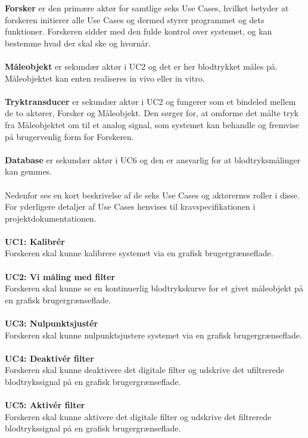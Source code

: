 \textbf{Forsker} er den primære aktør for samtlige seks Use Cases, hvilket betyder at forskeren initierer alle Use Cases og dermed styrer programmet og dets funktioner. Forskeren sidder med den fulde kontrol over systemet, og kan bestemme hvad der skal ske og hvornår.
\\\\
\textbf{Måleobjekt} er sekundær aktør i UC2 og det er her blodtrykket måles på. Måleobjektet kan enten realiseres in vivo eller in vitro.
\\\\
\textbf{Tryktransducer} er sekundær aktør i UC2 og fungerer som et bindeled mellem de to aktører, Forsker og Måleobjekt. Den sørger for, at omforme det målte tryk fra Måleobjektet om til et analog signal, som systemet kan behandle og fremvise på brugervenlig form for Forskeren. 
\\\\
\textbf{Database} er sekundær aktør i UC6 og den er ansvarlig for at blodtryksmålinger kan gemmes.
\\\\
Nedenfor ses en kort beskrivelse af de seks Use Cases og aktørernes roller i disse. For yderligere detaljer af Use Cases henvises til kravspecifikationen i projektdokumentationen.
\\\\
\textbf{UC1: Kalibrér}\\
Forskeren skal kunne kalibrere systemet via en grafisk brugergrænseflade.
\\\\
\textbf{UC2: Vi måling med filter}\\
Forskeren skal kunne se en kontinuerlig blodtrykskurve for et givet måleobjekt på en grafisk brugergrænseflade. 
\\\\
\textbf{UC3: Nulpunktsjustér}\\
Forskeren skal kunne nulpunktsjustere systemet via en grafisk brugergrænseflade.
\\\\
\textbf{UC4: Deaktivér filter}\\
Forskeren skal kunne deaktivere det digitale filter og udskrive det ufiltrerede blodtrykssignal på en grafisk brugergrænseflade.
\\\\
\textbf{UC5: Aktivér filter}\\
Forskeren skal kunne aktivere det digitale filter og udskrive det filtrerede blodtrykssignal på en grafisk brugergrænseflade.
